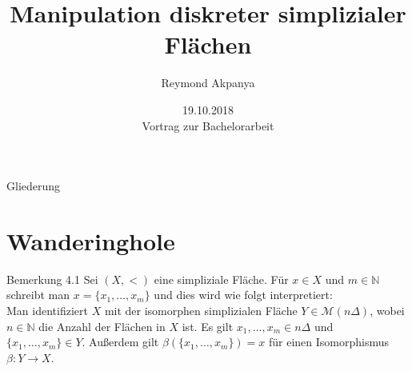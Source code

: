 \documentclass{beamer}
\author{Reymond Akpanya}
\title{Manipulation diskreter simplizialer Flächen}
\date{19.10.2018 \\[.5\baselineskip] Vortrag zur Bachelorarbeit}
\begin{document}
\frame{\maketitle}
\begin{frame}{Gliederung}
\tableofcontents
\end{frame}

\section{Wanderinghole}
\begin{frame}
\begin{block}{Bemerkung 4.1}
Sei $(X,<)$ eine simpliziale Fläche.
Für $x\in X$ und $m \in \mathbb{N}$ schreibt man $x=\{x_1,\ldots,x_m\}$ und dies wird wie folgt interpretiert:\\ Man identifiziert $X$ mit der isomorphen simplizialen Fläche $Y \in \mathcal{M}(n \Delta)$, wobei $n\in \mathbb{N}$ die Anzahl der Flächen in $X$ ist. Es gilt $x_1,\ldots,x_m \in n\Delta$ und $\{x_1,\ldots,x_m\}\in Y$. Außerdem gilt $\beta(\{x_1,\ldots,x_m\})=x$ für einen  Isomorphismus $\beta: Y \to X$.  

\end{block}
\end{frame}
\end{document}
